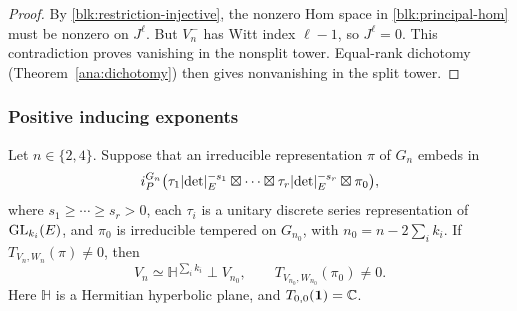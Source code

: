 \begin{proof}
By \eqref{blk:restriction-injective}, the nonzero Hom space in
\eqref{blk:principal-hom} must be nonzero on $J^\ell$.  But $V_n^-$
has Witt index $\ell-1$, so $J^\ell=0$.  This contradiction proves
vanishing in the nonsplit tower.  Equal-rank dichotomy
(Theorem~\ref{ana:dichotomy}) then gives nonvanishing in the split tower.
\end{proof}

\subsubsection{Positive inducing exponents}

\begin{lemma}
\label{blk:remove}
Let $n\in\{2,4\}$.  Suppose that an irreducible representation $\pi$ of
$G_n$ embeds in
\begin{equation}
 i_P^{G_n}\bigl(
   \tau_1\lvert\det\rvert_E^{-s_1}\boxtimes\cdots\boxtimes
   \tau_r\lvert\det\rvert_E^{-s_r}\boxtimes\pi_0\bigr),
 \label{blk:anti-standard}
\end{equation}
where $s_1\ge\cdots\ge s_r>0$, each $\tau_i$ is a unitary discrete
series representation of $\operatorname{GL}_{k_i}(E)$, and $\pi_0$ is irreducible
tempered on $G_{n_0}$, with $n_0=n-2\sum_i k_i$.  If
$T_{V_n,W_n}(\pi)\ne0$, then
\[
 V_n\simeq\mathbb H^{\sum_i k_i}\perp V_{n_0},
 \qquad T_{V_{n_0},W_{n_0}}(\pi_0)\ne0.
\]
Here $\mathbb H$ is a Hermitian hyperbolic plane, and
$T_{0,0}(\mathbf1)=\mathbb C$.
\end{lemma}

